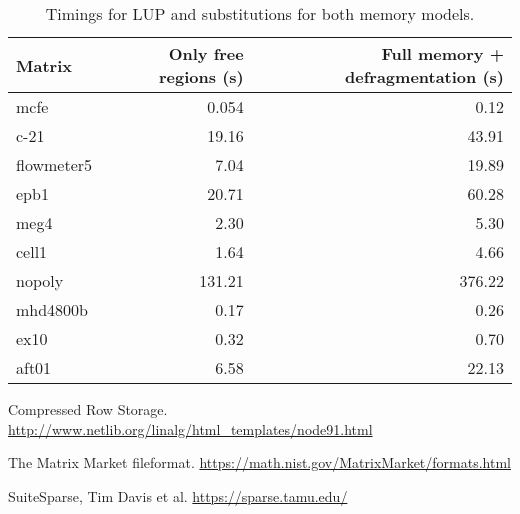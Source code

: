 \documentclass[10pt,a4paper]{article}
\begin{document}
\begin{table}
\begin{tabular}{|l|rr|}
\hline 
Matrix & Only free regions (s) & Full memory + defragmentation (s) \\ 
\hline 
mcfe & 0.054 & 0.12 \\
c-21 & 19.16 & 43.91  \\ 
flowmeter5 & 7.04 & 19.89 \\ 
epb1 & 20.71 &  60.28   \\ 
meg4 & 2.30 &  5.30   \\ 
cell1 & 1.64 & 4.66  \\ 
nopoly & 131.21 & 376.22 \\ 
mhd4800b & 0.17 & 0.26  \\ 
ex10 & 0.32 & 0.70 \\ 
aft01 & 6.58 & 22.13 \\ 
\hline 
\end{tabular} 
\label{times}
\caption{Timings for LUP and substitutions for both memory models.}
\end{table}


\begin{thebibliography}{XX}

Compressed Row Storage. \url{http://www.netlib.org/linalg/html_templates/node91.html}

The Matrix Market fileformat. \url{https://math.nist.gov/MatrixMarket/formats.html} 

SuiteSparse, Tim Davis et al. \url{https://sparse.tamu.edu/}

\end{thebibliography}
\end{document}
